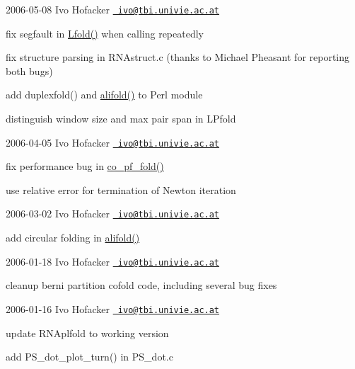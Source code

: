 2006-\/05-\/08 Ivo Hofacker \href{mailto:ivo@tbi.univie.ac.at}{\texttt{ ivo@tbi.\+univie.\+ac.\+at}}


\begin{DoxyItemize}
\item fix segfault in \mbox{\hyperlink{group__mfe__window__deprecated_gafdd1e11b5c7ad443b9f86b818e67bab4}{Lfold()}} when calling repeatedly
\item fix structure parsing in R\+N\+Astruct.\+c (thanks to Michael Pheasant for reporting both bugs)
\item add duplexfold() and \mbox{\hyperlink{group__mfe__global__deprecated_ga4cf00f0659e5f0480335d69e797f05b1}{alifold()}} to Perl module
\item distinguish window size and max pair span in L\+Pfold
\end{DoxyItemize}

2006-\/04-\/05 Ivo Hofacker \href{mailto:ivo@tbi.univie.ac.at}{\texttt{ ivo@tbi.\+univie.\+ac.\+at}}


\begin{DoxyItemize}
\item fix performance bug in \mbox{\hyperlink{group__part__func__global__deprecated_gae5c1e7331718669bdae7a86de2be6184}{co\+\_\+pf\+\_\+fold()}}
\item use relative error for termination of Newton iteration
\end{DoxyItemize}

2006-\/03-\/02 Ivo Hofacker \href{mailto:ivo@tbi.univie.ac.at}{\texttt{ ivo@tbi.\+univie.\+ac.\+at}}


\begin{DoxyItemize}
\item add circular folding in \mbox{\hyperlink{group__mfe__global__deprecated_ga4cf00f0659e5f0480335d69e797f05b1}{alifold()}}
\end{DoxyItemize}

2006-\/01-\/18 Ivo Hofacker \href{mailto:ivo@tbi.univie.ac.at}{\texttt{ ivo@tbi.\+univie.\+ac.\+at}}


\begin{DoxyItemize}
\item cleanup berni partition cofold code, including several bug fixes
\end{DoxyItemize}

2006-\/01-\/16 Ivo Hofacker \href{mailto:ivo@tbi.univie.ac.at}{\texttt{ ivo@tbi.\+univie.\+ac.\+at}}


\begin{DoxyItemize}
\item update R\+N\+Aplfold to working version
\item add P\+S\+\_\+dot\+\_\+plot\+\_\+turn() in P\+S\+\_\+dot.\+c
\end{DoxyItemize}

